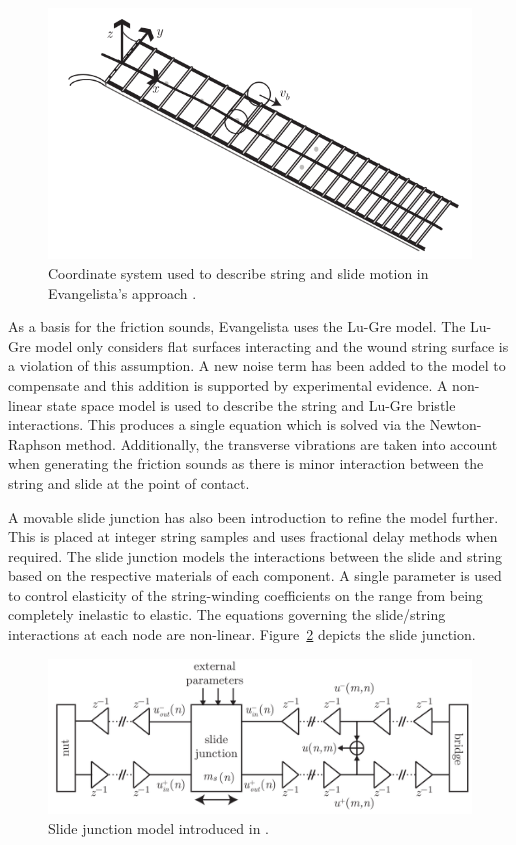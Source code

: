 \documentclass[main.tex]{subfiles}
\begin{document}
\begin{figure}[h]
    \centering
    \includegraphics[scale=.65]{./images/diagrams/EvangelistaCoordinateSystem.png}
    \caption{Coordinate system used to describe string and slide motion in Evangelista's approach .}
    \label{fig:EvangelistaCoordinateSystem}
\end{figure}

As a basis for the friction sounds, Evangelista uses the Lu-Gre model. The Lu-Gre model only considers flat surfaces interacting and the wound string surface is a violation of this assumption. A new noise term has been added to the model to compensate and this addition is supported by experimental evidence. A non-linear state space model is used to describe the string and Lu-Gre bristle interactions. This produces a single equation which is solved via the Newton-Raphson method. Additionally, the transverse vibrations are taken into account when generating the friction sounds as there is minor interaction between the string and slide at the point of contact. 

A movable slide junction has also been introduction to refine the model further. This is placed at integer string samples and uses fractional delay methods when required. The slide junction models the interactions between the slide and string based on the respective materials of each component. A single parameter is used to control elasticity of the string-winding coefficients on the range from being completely inelastic to elastic. The equations governing the slide/string interactions at each node are non-linear. Figure~\ref{fig:EvangelistaSlideJunction} depicts the slide junction.

\begin{figure}[h]
    \centering
    \includegraphics[scale=.5]{./images/diagrams/EvangelistaSlideJunction.png}
    \caption{Slide junction model introduced in .}
    \label{fig:EvangelistaSlideJunction}
\end{figure}
\end{document}
